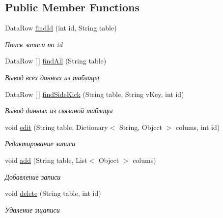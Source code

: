 \subsection*{Public Member Functions}
\begin{DoxyCompactItemize}
\item 
Data\+Row \mbox{\hyperlink{classpatterns_kursach_1_1_storage_adapter_a6b1e7c2a228f04ef4708702a8e11f114}{find\+Id}} (int id, String table)
\begin{DoxyCompactList}\small\item\em Поиск записи по id \end{DoxyCompactList}\item 
Data\+Row \mbox{[}$\,$\mbox{]} \mbox{\hyperlink{classpatterns_kursach_1_1_storage_adapter_a08e1b401021fac85dfd2f22a8654171a}{find\+All}} (String table)
\begin{DoxyCompactList}\small\item\em Вывод всех данных из таблицы \end{DoxyCompactList}\item 
Data\+Row \mbox{[}$\,$\mbox{]} \mbox{\hyperlink{classpatterns_kursach_1_1_storage_adapter_a25fff62c20799364eebdb38515169fb1}{find\+Side\+Kick}} (String table, String v\+Key, int id)
\begin{DoxyCompactList}\small\item\em Вывод данных из связаной таблицы \end{DoxyCompactList}\item 
void \mbox{\hyperlink{classpatterns_kursach_1_1_storage_adapter_abb78e8f3b4afc32f724141fd36cf3bfb}{edit}} (String table, Dictionary$<$ String, Object $>$ colums, int id)
\begin{DoxyCompactList}\small\item\em Редактирование записи \end{DoxyCompactList}\item 
void \mbox{\hyperlink{classpatterns_kursach_1_1_storage_adapter_a1a6b043621bfa53482563397597aa046}{add}} (String table, List$<$ Object $>$ colums)
\begin{DoxyCompactList}\small\item\em Добавление записи \end{DoxyCompactList}\item 
void \mbox{\hyperlink{classpatterns_kursach_1_1_storage_adapter_a6c87c580a8bdc3e2803ae31e59ad0071}{delete}} (String table, int id)
\begin{DoxyCompactList}\small\item\em Удаление зщаписи \end{DoxyCompactList}\item 

\end{DoxyCompactItemize}
